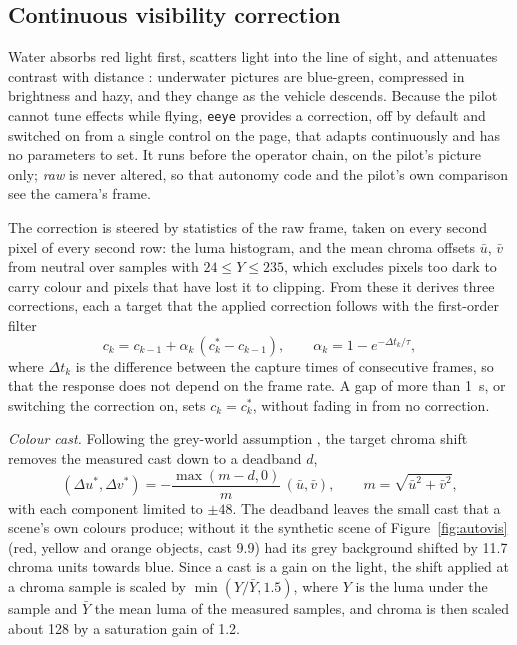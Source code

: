 \documentclass[a4paper,fleqn]{cas-sc}
\newcommand{\eeye}{\texttt{eeye}}
\begin{document}
\subsection{Continuous visibility correction}\label{sec:autovis}

Water absorbs red light first, scatters light into the line of sight, and attenuates
contrast with distance \citep{jaffe1990,schettini2010}: underwater pictures are
blue-green, compressed in brightness and hazy, and they change as the vehicle
descends. Because the pilot cannot tune effects while flying, \eeye{} provides a
correction, off by default and switched on from a single control on the page, that
adapts continuously and has no parameters to set. It runs before the operator chain,
on the pilot's picture only; \emph{raw} is never altered, so that autonomy code and the
pilot's own comparison see the camera's frame.

The correction is steered by statistics of the raw frame, taken on every second pixel
of every second row: the luma histogram, and the mean chroma offsets $\bar u$,
$\bar v$ from neutral over samples with $24 \leq Y \leq 235$, which excludes pixels
too dark to carry colour and pixels that have lost it to clipping. From these it
derives three corrections, each a target that the applied correction follows with the
first-order filter
\begin{equation}\label{eq:smooth}
  c_k = c_{k-1} + \alpha_k\,(c^{*}_k - c_{k-1}), \qquad
  \alpha_k = 1 - e^{-\Delta t_k/\tau},
\end{equation}
where $\Delta t_k$ is the difference between the capture times of consecutive frames,
so that the response does not depend on the frame rate. A gap of more than 1~s, or
switching the correction on, sets $c_k = c^{*}_k$, without fading in from no correction.

\emph{Colour cast.} Following the grey-world assumption \citep{buchsbaum1980}, the
target chroma shift removes the measured cast down to a deadband $d$,
\begin{equation}\label{eq:cast}
  (\Delta u^{*}, \Delta v^{*}) = -\frac{\max(m - d, 0)}{m}\,(\bar u, \bar v),
  \qquad m = \sqrt{\bar u^2 + \bar v^2},
\end{equation}
with each component limited to $\pm 48$. The deadband leaves the small cast that a
scene's own colours produce; without it the synthetic scene of Figure~\ref{fig:autovis}
(red, yellow and orange objects, cast 9.9) had its grey background shifted by 11.7
chroma units towards blue. Since a cast is a gain on the light, the shift applied at a
chroma sample is scaled by $\min(Y/\bar Y, 1.5)$, where $Y$ is the luma under the
sample and $\bar Y$ the mean luma of the measured samples, and chroma is then scaled
about 128 by a saturation gain of 1.2.
\end{document}
